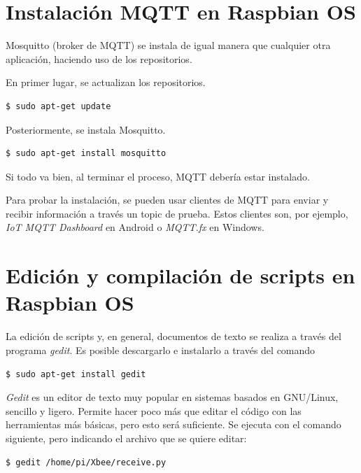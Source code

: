 \section{Instalación MQTT en Raspbian OS}\label{anexo:mqtt}

Mosquitto (broker de MQTT) se instala de igual manera que cualquier otra aplicación, haciendo uso de los repositorios.

En primer lugar, se actualizan los repositorios.

\begin{lstlisting}[frame=single, label=command:installmqtt1]
$ sudo apt-get update
\end{lstlisting}

Posteriormente, se instala Mosquitto.

\begin{lstlisting}[frame=single, label=command:installmqtt2]
$ sudo apt-get install mosquitto
\end{lstlisting}

Si todo va bien, al terminar el proceso, MQTT debería estar instalado.

Para probar la instalación, se pueden usar clientes de MQTT para enviar y recibir información a través un topic de prueba. Estos clientes son, por ejemplo, \textit{IoT MQTT Dashboard} en Android o \textit{MQTT.fx} en Windows.

\section{Edición y compilación de scripts en Raspbian OS}\label{anexo:scripts}

La edición de scripts y, en general, documentos de texto se realiza a través del programa \textit{gedit}. Es posible descargarlo e instalarlo a través del comando

\begin{lstlisting}[frame=single, label=command:installgedit]
$ sudo apt-get install gedit
\end{lstlisting} 

\textit{Gedit} es un editor de texto muy popular en sistemas basados en GNU/Linux, sencillo y ligero. Permite hacer poco más que editar el código con las herramientas más básicas, pero esto será suficiente. Se ejecuta con el comando siguiente, pero indicando el archivo que se quiere editar:

\begin{lstlisting}[frame=single, label=command:rungedit]
$ gedit /home/pi/Xbee/receive.py
\end{lstlisting} 


